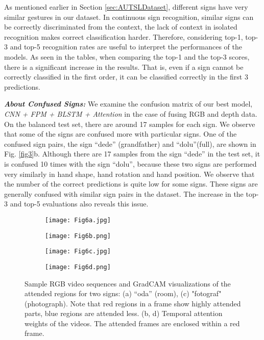 \documentclass[11pt, a4paper, singlecolumn]{article}
\begin{document}
As mentioned earlier in Section \ref{sec:AUTSLDataset}, different signs have very similar gestures in our dataset. In continuous sign recognition, similar signs can be correctly discriminated from the context, the lack of context in isolated recognition makes correct classification harder. Therefore, considering top-1, top-3 and top-5 recognition rates are useful to interpret the performances of the models. As seen in the tables, when comparing the top-1 and the top-3 scores, there is a significant increase in the results. That is, even if a sign cannot be correctly classified in the first order, it can be classified correctly in the first 3 predictions.

\textit{\textbf{About Confused Signs: }} We examine the confusion matrix of our best model, \textit{CNN + FPM + BLSTM + Attention} in the case of fusing RGB and depth data. On the balanced test set, there are around 17 samples for each sign.  We observe that some of the signs are confused more with particular signs. One of the confused sign pairs, the sign “dede” (grandfather) and “dolu”(full), are shown in Fig. \ref{fig3}b. Although there are 17 samples from the sign “dede” in the test set, it is confused 10 times with the sign “dolu”, because these two signs are performed very similarly in hand shape, hand rotation and hand position. We observe that the number of the correct predictions is quite low for some signs. These signs are generally confused with similar sign pairs in the dataset. The increase in the top-3 and top-5 evaluations also reveals this issue. 

\begin{figure}

	\centering
	\begin{subfigure}{1\textwidth}
	\texttt{[image: Fig6a.jpg]}
	\caption{}
	\label{fig:visualize_model_a}
	\end{subfigure}

	\begin{subfigure}{0.6\textwidth}
		\texttt{[image: Fig6b.png]}
		\caption{}
		\label{fig:visualize_model_b}
	\end{subfigure}

	\begin{subfigure}{1\textwidth}
	\texttt{[image: Fig6c.jpg]}
	\caption{}
	\label{fig:visualize_model_c}
	\end{subfigure}

	\begin{subfigure}{0.6\textwidth}
	\texttt{[image: Fig6d.png]}
	\caption{}
	\label{fig:visualize_model_d}	
	\end{subfigure}

\caption{Sample RGB video sequences and GradCAM \cite{selvaraju2017grad} visualizations of the attended regions for two signs: (a) “oda” (room), (c) "fotograf" (photograph). Note that red regions in a frame show highly attended parts, blue regions are attended less. (b, d) Temporal attention weights of the videos. The attended frames are enclosed within a red frame.}
\label{fig6} 
\end{figure}
\end{document}
